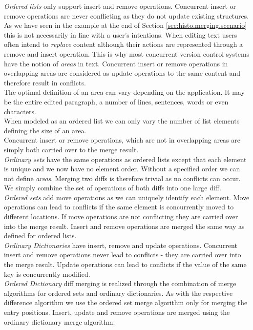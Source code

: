 \emph{Ordered lists} only support insert and remove operations.
Concurrent insert or remove operations are never conflicting as they do not update existing structures.
As we have seen in the example at the end of Section \ref{sec:histo.merging.scenario} this is not necessarily in line with a user's intentions.
When editing text users often intend to \emph{replace} content although their actions are represented through a remove and insert operation.
This is why most concurrent version control systems have the notion of \emph{areas} in text.
Concurrent insert or remove operations in overlapping areas are considered as update operations to the same content and therefore result in conflicts.\\
The optimal definition of an area can vary depending on the application.
It may be the entire edited paragraph, a number of lines, sentences, words or even characters.\\
When modeled as an ordered list we can only vary the number of list elements defining the size of an area.\\
Concurrent insert or remove operations, which are not in overlapping areas are simply both carried over to the merge result.\\

\emph{Ordinary sets} have the same operations as ordered lists except that each element is unique and we now have no element order.
Without a specified order we can not define \emph{areas}.
Merging two diffs is therefore trivial as no conflicts can occur.
We simply combine the set of operations of both diffs into one large diff.\\

\emph{Ordered sets} add move operations as we can uniquely identify each element.
Move operations can lead to conflicts if the same element is concurrently moved to different locations.
If move operations are not conflicting they are carried over into the merge result.
Insert and remove operations are merged the same way as defined for ordered lists.\\

\emph{Ordinary Dictionaries} have insert, remove and update operations.
Concurrent insert and remove operations never lead to conflicts - they are carried over into the merge result.
Update operations can lead to conflicts if the value of the same key is concurrently modified.\\

\emph{Ordered Dictionary} diff merging is realized through the combination of merge algorithms for ordered sets and ordinary dictionaries.
As with the respective difference algorithm we use the ordered set merge algorithm only for merging the entry positions.
Insert, update and remove operations are merged using the ordinary dictionary merge algorithm.

